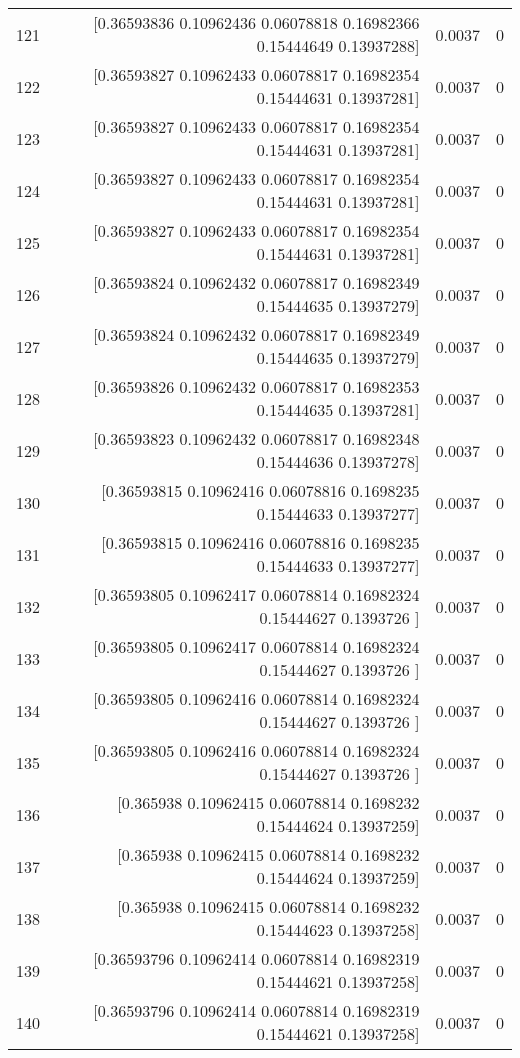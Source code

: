 \begin{longtable}{lrrr}
121 & [0.36593836 0.10962436 0.06078818 0.16982366 0.15444649 0.13937288] & 0.0037 & 0 \\
122 & [0.36593827 0.10962433 0.06078817 0.16982354 0.15444631 0.13937281] & 0.0037 & 0 \\
123 & [0.36593827 0.10962433 0.06078817 0.16982354 0.15444631 0.13937281] & 0.0037 & 0 \\
124 & [0.36593827 0.10962433 0.06078817 0.16982354 0.15444631 0.13937281] & 0.0037 & 0 \\
125 & [0.36593827 0.10962433 0.06078817 0.16982354 0.15444631 0.13937281] & 0.0037 & 0 \\
126 & [0.36593824 0.10962432 0.06078817 0.16982349 0.15444635 0.13937279] & 0.0037 & 0 \\
127 & [0.36593824 0.10962432 0.06078817 0.16982349 0.15444635 0.13937279] & 0.0037 & 0 \\
128 & [0.36593826 0.10962432 0.06078817 0.16982353 0.15444635 0.13937281] & 0.0037 & 0 \\
129 & [0.36593823 0.10962432 0.06078817 0.16982348 0.15444636 0.13937278] & 0.0037 & 0 \\
130 & [0.36593815 0.10962416 0.06078816 0.1698235  0.15444633 0.13937277] & 0.0037 & 0 \\
131 & [0.36593815 0.10962416 0.06078816 0.1698235  0.15444633 0.13937277] & 0.0037 & 0 \\
132 & [0.36593805 0.10962417 0.06078814 0.16982324 0.15444627 0.1393726 ] & 0.0037 & 0 \\
133 & [0.36593805 0.10962417 0.06078814 0.16982324 0.15444627 0.1393726 ] & 0.0037 & 0 \\
134 & [0.36593805 0.10962416 0.06078814 0.16982324 0.15444627 0.1393726 ] & 0.0037 & 0 \\
135 & [0.36593805 0.10962416 0.06078814 0.16982324 0.15444627 0.1393726 ] & 0.0037 & 0 \\
136 & [0.365938   0.10962415 0.06078814 0.1698232  0.15444624 0.13937259] & 0.0037 & 0 \\
137 & [0.365938   0.10962415 0.06078814 0.1698232  0.15444624 0.13937259] & 0.0037 & 0 \\
138 & [0.365938   0.10962415 0.06078814 0.1698232  0.15444623 0.13937258] & 0.0037 & 0 \\
139 & [0.36593796 0.10962414 0.06078814 0.16982319 0.15444621 0.13937258] & 0.0037 & 0 \\
140 & [0.36593796 0.10962414 0.06078814 0.16982319 0.15444621 0.13937258] & 0.0037 & 0 \\

\end{longtable}
